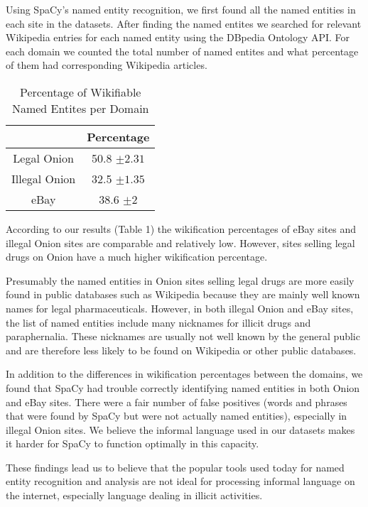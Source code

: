 \documentclass[11pt,a4paper]{article}
\begin{document}
Using SpaCy's named entity recognition, we first found all the named
entities in each site in the datasets. After finding the named entites
we searched for relevant Wikipedia entries for each named entity using
the DBpedia Ontology API. For each domain we counted the total number
of named entites and what percentage of them had corresponding Wikipedia
articles.

\begin{table}

\caption{Percentage of Wikifiable Named Entites per Domain}

\begin{centering}
\begin{tabular}{|c||c|}
\hline 
 & Percentage\tabularnewline
\hline 
\hline 
Legal Onion & 50.8 $\pm2.31$\tabularnewline
\hline 
\hline 
Illegal Onion & 32.5 $\pm1.35$\tabularnewline
\hline 
\hline 
eBay & 38.6 $\pm2$\tabularnewline
\hline 
\end{tabular}
\par\end{centering}
\end{table}
According to our results (Table 1) the wikification percentages of
eBay sites and illegal Onion sites are comparable and relatively low.
However, sites selling legal drugs on Onion have a much higher wikification
percentage.

Presumably the named entities in Onion sites selling legal drugs are
more easily found in public databases such as Wikipedia because they
are mainly well known names for legal pharmaceuticals. However, in
both illegal Onion and eBay sites, the list of named entities include
many nicknames for illicit drugs and paraphernalia. These nicknames
are usually not well known by the general public and are therefore
less likely to be found on Wikipedia or other public databases.

In addition to the differences in wikification percentages between
the domains, we found that SpaCy had trouble correctly identifying
named entities in both Onion and eBay sites. There were a fair number
of false positives (words and phrases that were found by SpaCy but
were not actually named entities), especially in illegal Onion sites.
We believe the informal language used in our datasets makes it harder
for SpaCy to function optimally in this capacity.

These findings lead us to believe that the popular tools used today
for named entity recognition and analysis are not ideal for processing
informal language on the internet, especially language dealing in
illicit activities. 
\end{document}
